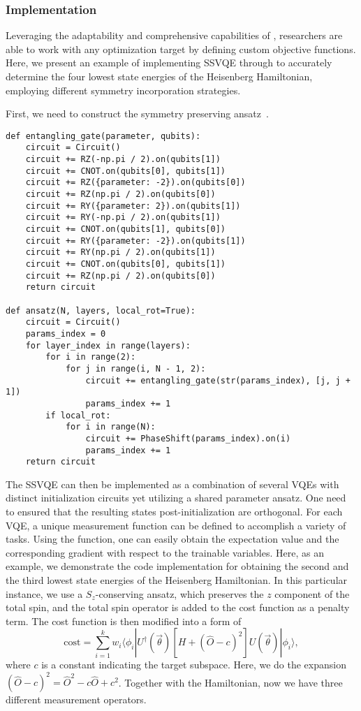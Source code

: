 \subsubsection{Implementation}
Leveraging the adaptability and comprehensive capabilities of \MindQuantum, researchers are able to work with any optimization target by defining custom objective functions. Here, we present an example of implementing SSVQE through \MindQuantum to accurately determine the four lowest state energies of the Heisenberg Hamiltonian, employing different symmetry incorporation strategies.

First, we need to construct the symmetry preserving ansatz~\cite{?}.
\begin{lstlisting}
def entangling_gate(parameter, qubits):
    circuit = Circuit()
    circuit += RZ(-np.pi / 2).on(qubits[1])
    circuit += CNOT.on(qubits[0], qubits[1])
    circuit += RZ({parameter: -2}).on(qubits[0])
    circuit += RZ(np.pi / 2).on(qubits[0])
    circuit += RY({parameter: 2}).on(qubits[1])
    circuit += RY(-np.pi / 2).on(qubits[1])
    circuit += CNOT.on(qubits[1], qubits[0])
    circuit += RY({parameter: -2}).on(qubits[1])
    circuit += RY(np.pi / 2).on(qubits[1])
    circuit += CNOT.on(qubits[0], qubits[1])
    circuit += RZ(np.pi / 2).on(qubits[0])
    return circuit

def ansatz(N, layers, local_rot=True):
    circuit = Circuit()
    params_index = 0
    for layer_index in range(layers):
        for i in range(2):
            for j in range(i, N - 1, 2):
                circuit += entangling_gate(str(params_index), [j, j + 1])
                params_index += 1
        if local_rot:
            for i in range(N):
                circuit += PhaseShift(params_index).on(i)
                params_index += 1
    return circuit
\end{lstlisting}

The SSVQE can then be implemented as a combination of several VQEs with distinct initialization circuits yet utilizing a shared parameter ansatz. One need to ensured that the resulting states post-initialization are orthogonal.
For each VQE, a unique measurement function can be defined to accomplish a variety of tasks.
Using the \getexpectationwithgrad function, one can easily obtain the expectation value and the corresponding gradient with respect to the trainable variables. Here, as an example, we demonstrate the code implementation for obtaining the second and the third lowest state energies of the Heisenberg Hamiltonian. In this particular instance,
we use a $S_z$-conserving ansatz, which preserves the $z$ component of the total spin, and the total spin operator is added to the cost function as a penalty term. The cost function is then modified into a form of
\begin{equation}
    \mathrm{cost} = \sum_{i=1}^{k} w_{i} \langle \phi_{i}| U^{\dagger}(\vec{\theta}) [H + (\hat{O} - c)^2] U(\vec{\theta}) | \phi_{i} \rangle,
    \label{ssvqe_cost_pen}
\end{equation}
where $c$ is a constant indicating the target subspace. Here, we do the expansion $(\hat{O} - c)^2 {=} \hat{O}^2 {-} c\hat{O} {+} c^2$. Together with the Hamiltonian, now we have three different measurement operators.

